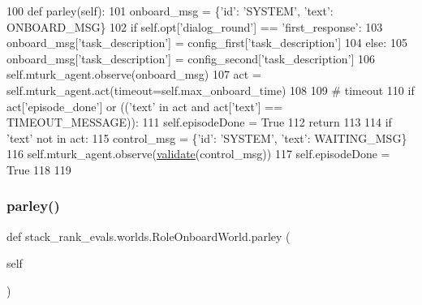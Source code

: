 \begin{DoxyCode}
100     \textcolor{keyword}{def }parley(self):
101         onboard\_msg = \{\textcolor{stringliteral}{'id'}: \textcolor{stringliteral}{'SYSTEM'}, \textcolor{stringliteral}{'text'}: ONBOARD\_MSG\}
102         \textcolor{keywordflow}{if} self.opt[\textcolor{stringliteral}{'dialog\_round'}] == \textcolor{stringliteral}{'first\_response'}:
103             onboard\_msg[\textcolor{stringliteral}{'task\_description'}] = config\_first[\textcolor{stringliteral}{'task\_description'}]
104         \textcolor{keywordflow}{else}:
105             onboard\_msg[\textcolor{stringliteral}{'task\_description'}] = config\_second[\textcolor{stringliteral}{'task\_description'}]
106         self.mturk\_agent.observe(onboard\_msg)
107         act = self.mturk\_agent.act(timeout=self.max\_onboard\_time)
108 
109         \textcolor{comment}{# timeout}
110         \textcolor{keywordflow}{if} act[\textcolor{stringliteral}{'episode\_done'}] \textcolor{keywordflow}{or} ((\textcolor{stringliteral}{'text'} \textcolor{keywordflow}{in} act \textcolor{keywordflow}{and} act[\textcolor{stringliteral}{'text'}] == TIMEOUT\_MESSAGE)):
111             self.episodeDone = \textcolor{keyword}{True}
112             \textcolor{keywordflow}{return}
113 
114         \textcolor{keywordflow}{if} \textcolor{stringliteral}{'text'} \textcolor{keywordflow}{not} \textcolor{keywordflow}{in} act:
115             control\_msg = \{\textcolor{stringliteral}{'id'}: \textcolor{stringliteral}{'SYSTEM'}, \textcolor{stringliteral}{'text'}: WAITING\_MSG\}
116             self.mturk\_agent.observe(\hyperlink{namespaceparlai_1_1core_1_1worlds_afc3fad603b7bce41dbdc9cdc04a9c794}{validate}(control\_msg))
117             self.episodeDone = \textcolor{keyword}{True}
118 
119 
\end{DoxyCode}
\mbox{\label{classstack__rank__evals_1_1worlds_1_1RoleOnboardWorld_ad01c1064fd3c5f1ac4746d043f47bfbc}} 
\subsubsection{\texorpdfstring{parley()}{parley()}\hspace{0.1cm}{\footnotesize\ttfamily [2/2]}}
{\footnotesize\ttfamily def stack\+\_\+rank\+\_\+evals.\+worlds.\+Role\+Onboard\+World.\+parley (\begin{DoxyParamCaption}\item[{}]{self }\end{DoxyParamCaption})}



